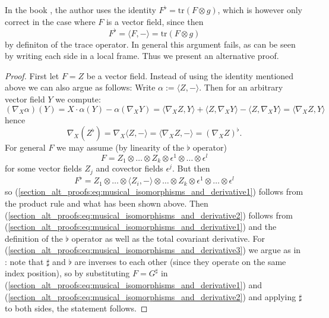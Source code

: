 In the book \cite{lee2018riemannian}, the author uses the identity $F^\flat = \mathrm{tr}(F \otimes g)$, which is however only correct in the case where $F$ is a vector field, since then 
\[
F^\flat = \langle F,- \rangle = \mathrm{tr}(F \otimes g)
\]
by definiton of the trace operator. In general this argument fails, as can be seen by writing each side in a local frame. Thus we present an alternative proof.

\begin{proof}
    First let $F = Z$ be a vector field. Instead of using the identity mentioned above we can also argue as follows: Write $\alpha := \langle Z, - \rangle$. Then for an arbitrary vector field $Y$ we compute:
    \[
    (\nabla_X \alpha) (Y) = X \cdot \alpha(Y) - \alpha(\nabla_X Y) = \langle \nabla_X Z, Y\rangle + \langle Z, \nabla_X Y \rangle - \langle Z, \nabla_X Y \rangle = \langle \nabla_X Z, Y\rangle
    \]
    hence 
    \[
    \nabla_X (Z^\flat) = \nabla_X \langle Z,-\rangle = \langle \nabla_X Z, -\rangle = (\nabla_X Z)^\flat.
    \]
    For general $F$ we may assume (by linearity of the $\flat$ operator)
    \[
    F = Z_1 \otimes \ldots \otimes Z_k \otimes \epsilon^1 \otimes \ldots \otimes \epsilon^l
    \]
    for some vector fields $Z_j$ and covector fields $\epsilon^j$. But then 
    \[
    F^\flat = Z_1 \otimes \ldots \otimes \langle Z_i , -\rangle \otimes \ldots \otimes Z_k \otimes \epsilon^1 \otimes \ldots \otimes \epsilon^l
    \]
    so (\ref{section_alt_proofs:eq:musical_isomorphisms_and_derivative1}) follows from the product rule and what has been shown above. Then (\ref{section_alt_proofs:eq:musical_isomorphisms_and_derivative2}) follows from (\ref{section_alt_proofs:eq:musical_isomorphisms_and_derivative1}) and the definition of the $\flat$ operator as well as the total covariant derivative. For (\ref{section_alt_proofs:eq:musical_isomorphisms_and_derivative3}) we argue as in \cite{lee2018riemannian}: note that $\sharp$ and $\flat$ are inverses to each other (since they operate on the same index position), so by substituting $F = G^\sharp$ in (\ref{section_alt_proofs:eq:musical_isomorphisms_and_derivative1}) and (\ref{section_alt_proofs:eq:musical_isomorphisms_and_derivative2}) and applying $\sharp$ to both sides, the statement follows.
\end{proof}
